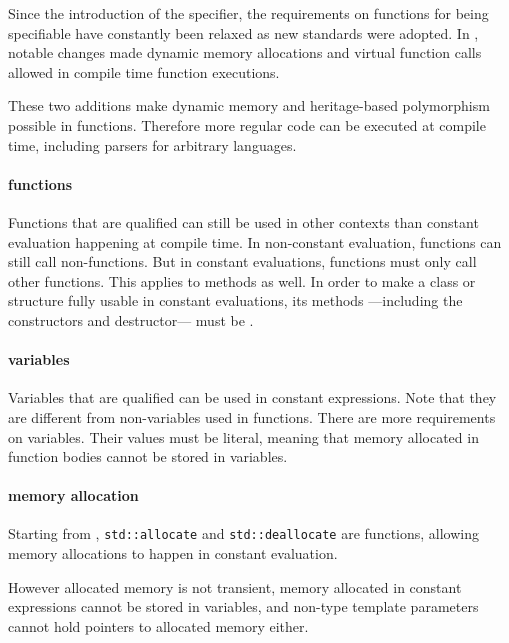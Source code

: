 \documentclass[../../main]{subfiles}
\begin{document}
Since the introduction of the \constexpr specifier, the requirements on
functions for being \constexpr specifiable have constantly been relaxed as new
\cpp standards were adopted. In , notable changes made dynamic memory
allocations\cite{constexpr-memory} and virtual \constexpr function
calls\cite{virtual-constexpr} allowed in compile time \constexpr function
executions.

These two additions make dynamic memory and heritage-based polymorphism
possible in \constexpr functions. Therefore more regular \cpp code can be
executed at compile time, including parsers for arbitrary languages.

\paragraph{\constexpr functions} Functions that are \constexpr qualified can
still be used in other contexts than constant evaluation happening at
compile time. In non-constant evaluation, \constexpr functions can still call
non-\constexpr functions. But in constant evaluations, \constexpr functions must
only call other \constexpr functions. This applies to methods as well.
In order to make a \cpp class or structure fully usable in constant evaluations,
its methods ---including the constructors and destructor--- must be \constexpr.

\paragraph{\constexpr variables} Variables that are \constexpr qualified can be
used in constant expressions. Note that they are different from
non-\constexpr variables used in \constexpr functions.
There are more requirements on \constexpr variables.
Their values must be literal, meaning that memory allocated in \constexpr
function bodies cannot be stored in \constexpr variables.

\paragraph{\constexpr memory allocation} Starting from ,
\lstinline{std::allocate} and \lstinline{std::deallocate} are \constexpr
functions, allowing memory allocations to happen in constant evaluation.

However \constexpr allocated memory is not transient, \ie memory allocated in
constant expressions cannot be stored in \constexpr variables, and non-type
template parameters cannot hold pointers to \constexpr allocated memory either.
\end{document}
